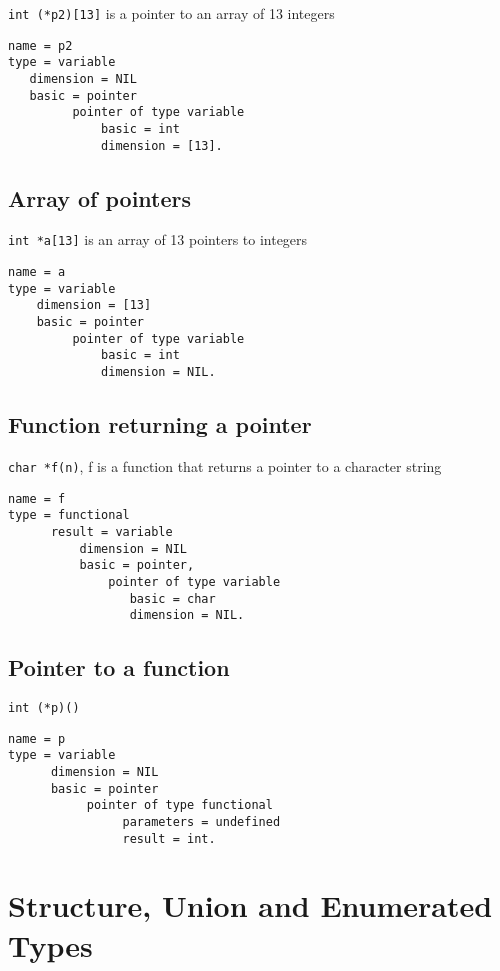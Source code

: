 \documentclass[a4paper]{report}
\begin{document}
\lstinline/int (*p2)[13]/ is a pointer to an array of 13 integers
\begin{verbatim}
name = p2
type = variable
   dimension = NIL
   basic = pointer
         pointer of type variable
             basic = int
             dimension = [13].
\end{verbatim}

\subsection{Array of pointers}

\lstinline/int *a[13]/ is an array of 13 pointers to integers
\begin{verbatim}
name = a
type = variable
    dimension = [13]
    basic = pointer
         pointer of type variable
             basic = int
             dimension = NIL.
\end{verbatim}

\subsection{Function returning a pointer}

\lstinline/char *f(n)/, f is a function that returns a pointer to a character
string
\begin{verbatim}
name = f
type = functional 
      result = variable
          dimension = NIL
          basic = pointer,
              pointer of type variable
                 basic = char
                 dimension = NIL. 
\end{verbatim}

\subsection{Pointer to a function}

\lstinline/int (*p)()/
\begin{verbatim}
name = p
type = variable
      dimension = NIL
      basic = pointer
           pointer of type functional
                parameters = undefined
                result = int.
\end{verbatim}

\section{Structure, Union and Enumerated Types} 
\end{document}
